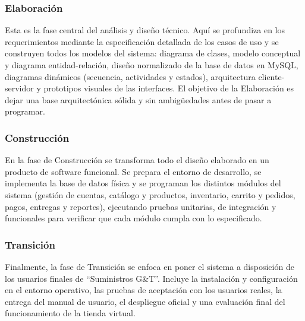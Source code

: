 \subsubsection{Elaboración}
Esta es la fase central del análisis y diseño técnico. Aquí se profundiza en los requerimientos mediante la especificación detallada de los casos de uso y se construyen todos los modelos del sistema: diagrama de clases, modelo conceptual y diagrama entidad-relación, diseño normalizado de la base de datos en MySQL, diagramas dinámicos (secuencia, actividades y estados), arquitectura cliente-servidor y prototipos visuales de las interfaces. El objetivo de la Elaboración es dejar una base arquitectónica sólida y sin ambigüedades antes de pasar a programar.

\subsubsection{Construcción}
En la fase de Construcción se transforma todo el diseño elaborado en un producto de software funcional. Se prepara el entorno de desarrollo, se implementa la base de datos física y se programan los distintos módulos del sistema (gestión de cuentas, catálogo y productos, inventario, carrito y pedidos, pagos, entregas y reportes), ejecutando pruebas unitarias, de integración y funcionales para verificar que cada módulo cumpla con lo especificado.

\subsubsection{Transición}
Finalmente, la fase de Transición se enfoca en poner el sistema a disposición de los usuarios finales de ``Suministros G\&T''. Incluye la instalación y configuración en el entorno operativo, las pruebas de aceptación con los usuarios reales, la entrega del manual de usuario, el despliegue oficial y una evaluación final del funcionamiento de la tienda virtual.
